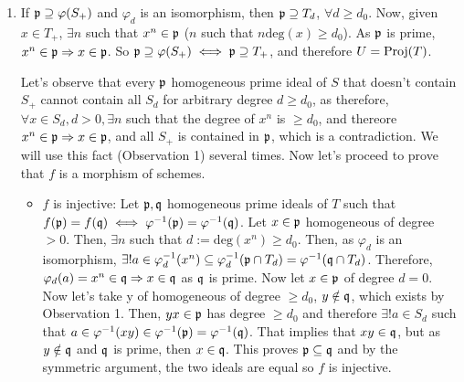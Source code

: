 \begin{sol}
\begin{enumerate}[label=\alph*)]
		\item If $\mathfrak{p} \supseteq \varphi(S_+)$ and $\varphi_d$ is an isomorphism, then $\mathfrak{p} \supseteq T_d$, $\forall d \geq d_0$. Now, given $x \in T_+$, $\exists n$ such that $x^n \in \mathfrak{p}$ ($n$ such that $n \mathrm{deg}(x) \geq d_0$). As $\mathfrak{p}$ is prime, $x^n \in \mathfrak{p} \Rightarrow x \in \mathfrak{p}$. So $\mathfrak{p} \supseteq \varphi(S_+) \iff \mathfrak{p} \supseteq T_+$, and therefore $U = \mathrm{Proj}(T)$.

		Let's observe that every $\mathfrak{p}$ homogeneous prime ideal of $S$ that doesn't contain $S_+$ cannot contain all $S_d$ for arbitrary degree $d \geq d_0$, as therefore, $\forall x \in S_d, d > 0, \exists n$ such that the degree of $x^n$ is $\geq d_0$, and thereore $x^n \in \mathfrak{p} \Rightarrow x \in \mathfrak{p}$, and all $S_+$ is contained in $\mathfrak{p}$, which is a contradiction. We will use this fact (Observation 1) several times. Now let's proceed to prove that $f$ is a morphism of schemes.

		\begin{itemize}
			\item $f$ is injective: Let $\mathfrak{p}, \mathfrak{q}$ homogeneous prime ideals of $T$ such that $f(\mathfrak{p}) = f(\mathfrak{q}) \iff \varphi^{-1}(\mathfrak{p}) = \varphi^{-1}(\mathfrak{q})$. Let $x \in \mathfrak{p}$ homogeneous of degree $> 0$. Then, $\exists n$ such that $d:= \mathrm{deg}(x^n) \geq d_0$. Then, as $\varphi_d$ is an isomorphism, $\exists! a \in \varphi_d^{-1}(x^n) \subseteq \varphi_d^{-1}(\mathfrak{p} \cap T_d) = \varphi^{-1}(\mathfrak{q} \cap T_d)$. Therefore, $\varphi_d(a) = x^n \in \mathfrak{q} \Rightarrow x \in \mathfrak{q}$ as $\mathfrak{q}$ is prime. Now let $x \in \mathfrak{p}$ of degree $d = 0$. Now let's take y of homogeneous of degree $\geq d_0$, $y \notin \mathfrak{q}$, which exists by Observation 1. Then, $yx \in \mathfrak{p}$ has degree $\geq d_0$ and therefore $\exists! a \in S_d$ such that $a \in \varphi^{-1}(xy) \in \varphi^{-1}(\mathfrak{p}) = \varphi^{-1}(\mathfrak{q})$. That implies that $xy \in \mathfrak{q}$, but as $y \notin \mathfrak{q}$ and $\mathfrak{q}$ is prime, then $x \in \mathfrak{q}$. This proves $\mathfrak{p} \subseteq \mathfrak{q}$ and by the symmetric argument, the two ideals are equal so $f$ is injective.


\end{itemize}
\end{enumerate}
\end{sol}
